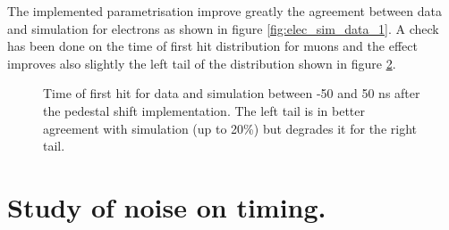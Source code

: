 \documentclass[twoside,a4paper,11pt]{article}
\begin{document}
\begin{appendix}
\begin{figure}[htbp]
	\label{fig:mc_para}
\end{figure}
The implemented parametrisation improve greatly the agreement between data and simulation for electrons as shown in figure \ref{fig:elec_sim_data_1}. A check has been done on the time of first hit distribution for muons and the effect improves also slightly the left tail of the distribution shown in figure \ref{fig:muon_ped_shift}.
\begin{figure}[htbp]
\begin{center}
\caption{Time of first hit for data and simulation between -50 and 50 ns after the pedestal shift implementation. The left tail is in better agreement with simulation (up to 20\%) but degrades it for the right tail.}
\label{fig:muon_ped_shift}
\end{center}
\end{figure}
\newpage
\section{Study of noise on timing.}
\label{appendix:noise_timing}


\end{appendix}
\end{document}
